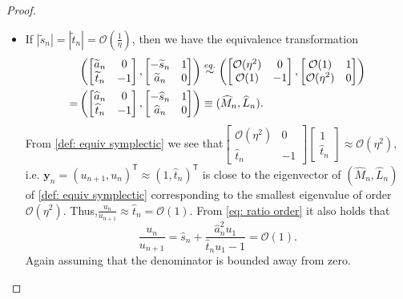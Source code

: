 \documentclass[11pt]{article}
\numberwithin{equation}{section}
\begin{document}
\begin{proof}
\begin{itemize}
\item[(ii)] If $|\widetilde{s}_n| = |\widetilde{t}_n| = \mathcal{O}(\frac{1}{\eta})$, then we have the equivalence transformation
\begin{align} \label{def: equiv symplectic}
&\left(
\begin{bmatrix}
\widetilde{a}_n & 0 \\
\widetilde{t}_n & -1
\end{bmatrix},
\begin{bmatrix}
-\widetilde{s}_n & 1 \\
\widetilde{a}_n & 0
\end{bmatrix}
\right)
\overset{eq.}{\sim}
\left(
\begin{bmatrix}
\mathcal{O}(\eta^2) & 0 \\
\mathcal{O}(1) & -1
\end{bmatrix},
\begin{bmatrix}
\mathcal{O}(1) & 1 \\
\mathcal{O}(\eta^2) & 0
\end{bmatrix}
\right) \notag \\
= &
\left(
\begin{bmatrix}
\widehat{a}_n & 0 \\
\widehat{t}_n & -1
\end{bmatrix},
\begin{bmatrix}
-\widehat{s}_n & 1 \\
\widehat{a}_n & 0
\end{bmatrix}
\right) \equiv (\widehat{M}_n,\widehat{L}_n) .
\end{align}
From \eqref{def: equiv symplectic} we see that$\begin{bmatrix}
\mathcal{O}(\eta^2) & 0 \\
\widehat{t}_n & -1
\end{bmatrix}
\begin{bmatrix}
1 \\
\widehat{t}_n
\end{bmatrix}
\approx \mathcal{O}(\eta^2),
$ i.e. $ \boldsymbol{y}_n = (u_{n+1},u_n)^{\mathsf{T}} \approx (1,\widehat{t}_n)^{\mathsf{T}}$ is close to the eigenvector of $(\widehat{M}_n,\widehat{L}_n)$ of \eqref{def: equiv symplectic} corresponding to the smallest eigenvalue of order $\mathcal{O}(\eta^2)$. Thus,$ \frac{u_n}{u_{n+1}} \approx \widehat{t}_n = \mathcal{O}(1).$ From \eqref{eq: ratio order} it also holds that
\begin{equation} \label{eq: proof of ratio order}
\frac{u_n}{u_{n+1}}
=
\widehat{s}_n + \frac{\widehat{a}_n^2 u_1}{\widehat{t}_n u_1 -1}
= \mathcal{O}(1).
\end{equation}
Again assuming that the denominator is bounded away from zero.


\end{itemize}
\end{proof}
\end{document}
